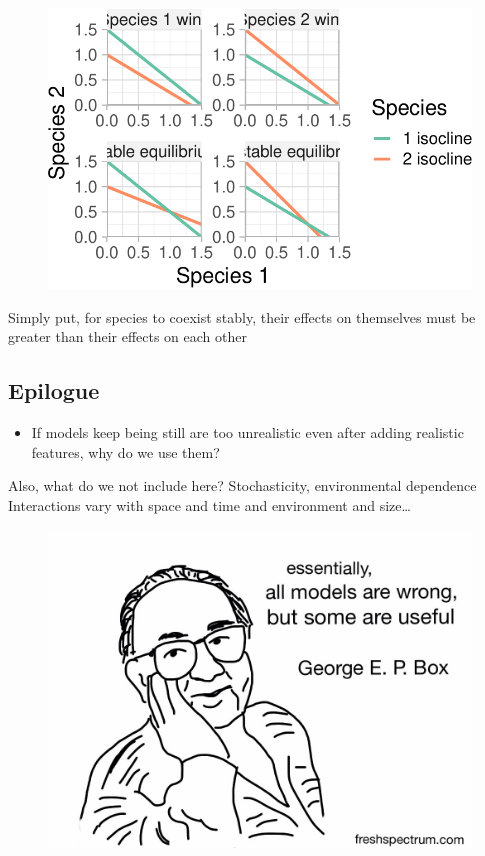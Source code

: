 \documentclass[
  letterpaper,
  DIV=11,
  numbers=noendperiod]{scrartcl}
\providecommand{\tightlist}{%
  \setlength{\itemsep}{0pt}\setlength{\parskip}{0pt}}\usepackage{longtable,booktabs,array}
\begin{document}
\begin{figure}[H]

{\centering \includegraphics{ecological_interactions_files/figure-pdf/unnamed-chunk-20-1.pdf}

}

\end{figure}

Simply put, for species to coexist stably, their effects on themselves
must be greater than their effects on each other

\hypertarget{epilogue}{%
\subsection{Epilogue}\label{epilogue}}

\begin{itemize}
\tightlist
\item
  If models keep being still are too unrealistic even after adding
  realistic features, why do we use them?
\end{itemize}

Also, what do we not include here? Stochasticity, environmental
dependence Interactions vary with space and time and environment and
size\ldots{}

\begin{figure}

{\centering \includegraphics{images/g_box.png}

}

\end{figure}
\end{document}
